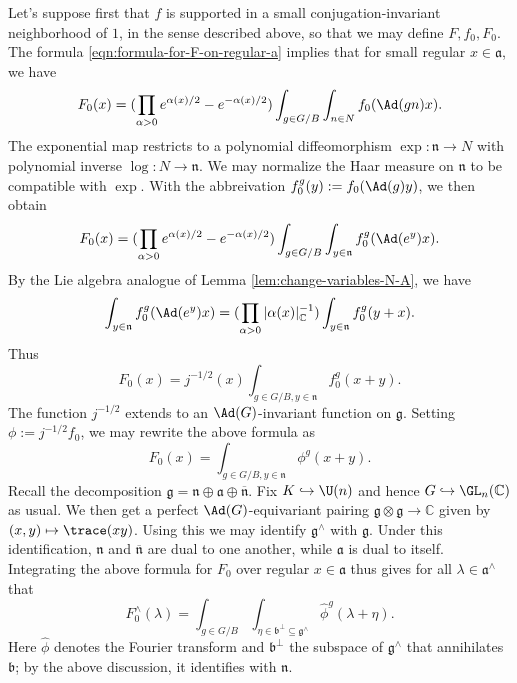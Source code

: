 \documentclass[reqno]{amsart} 
\begin{document}
Let's suppose first that $f$ is supported in a small conjugation-invariant neighborhood of $1$, in the sense described above, so that we may define $F, f_0, F_0$.  The formula \eqref{eqn:formula-for-F-on-regular-a} implies that for small regular $x \in \mathfrak{a}$, we have
\begin{equation}\label{eqn:}
  F_0(x)
  =
  (
  \prod _{\alpha > 0 }
  e ^{\alpha(x)/2}
  - e^{-\alpha(x)/2}
  )
  \int_{g \in G/B}
  \int_{n \in N}
  f_0(\Ad(g n) x).
\end{equation}
The exponential map restricts to a polynomial diffeomorphism $\exp : \mathfrak{n} \rightarrow N$ with polynomial inverse $\log : N \rightarrow \mathfrak{n}$.  We may normalize the Haar measure on $\mathfrak{n}$ to be compatible with $\exp$.  With the abbreivation $f_0^g(y) := f_0(\Ad(g) y)$, we then obtain
\begin{equation}\label{eqn:}
  F_0(x)
  = 
  (
  \prod _{\alpha > 0 }
  e ^{\alpha(x)/2}
  - e^{-\alpha(x)/2}
  )
  \int_{g \in G/B}
  \int_{y \in \mathfrak{n}}
  f_0^g(\Ad(e^y) x).
\end{equation}
By the Lie algebra analogue of Lemma \ref{lem:change-variables-N-A}, we have
\begin{equation}\label{eqn:lie-algebra-change-of-var}
  \int_{y \in \mathfrak{n}}
  f_0^g(\Ad(e^y) x)
  =
  (
  \prod_{\alpha>0} |\alpha(x)|_{\mathbb{C}}^{-1}
  )
  \int_{y \in \mathfrak{n}}
  f_0^g(y + x).
\end{equation}
Thus
\begin{equation}\label{eqn:}
  F_0(x)
  = j^{-1/2}(x)
  \int_{g \in G/B, y \in \mathfrak{n}}
  f_0^g(x+y).
\end{equation}
The function $j^{-1/2}$ extends to an $\Ad(G)$-invariant function on $\mathfrak{g}$.  Setting $\phi := j^{-1/2} f_0$, we may rewrite the above formula as
\begin{equation}\label{eqn:}
  F_0(x)
  = \int_{g \in G/B, y \in \mathfrak{n}}
  \phi^g(x+y).
\end{equation}
Recall the decomposition $\mathfrak{g} = \mathfrak{n} \oplus \mathfrak{a} \oplus \overline{\mathfrak{n} }$.  Fix $K \hookrightarrow \U(n)$ and hence $G \hookrightarrow \GL_n(\mathbb{C})$ as usual.  We then get a perfect $\Ad(G)$-equivariant pairing $\mathfrak{g} \otimes \mathfrak{g} \rightarrow \mathbb{C}$ given by $(x,y) \mapsto \trace(x y)$.  Using this we may identify $\mathfrak{g}^\wedge$ with $\mathfrak{g}$.  Under this identification, $\mathfrak{n}$ and $\overline{\mathfrak{n}}$ are dual to one another, while $\mathfrak{a}$ is dual to itself.  Integrating the above formula for $F_0$ over regular $x \in \mathfrak{a}$ thus gives for all $\lambda \in \mathfrak{a}^\wedge$ that
\begin{equation}\label{eqn:}
  F_0^\wedge(\lambda)
  = \int_{g \in G/B}
  \int_{\eta \in \mathfrak{b}^\perp \subseteq
    \mathfrak{g}^\wedge}
  \hat{\phi}^g(\lambda+\eta).
\end{equation}
Here $\hat{\phi}$ denotes the Fourier transform and $\mathfrak{b}^\perp$ the subspace of $\mathfrak{g}^\wedge$ that annihilates $\mathfrak{b}$; by the above discussion, it identifies with $\mathfrak{n}$.
\end{document}
